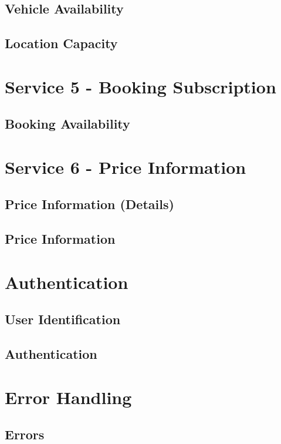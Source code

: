 \subsection*{Vehicle Availability}



\subsection*{Location Capacity}



\section{Service 5 - Booking Subscription}
\label{sec:Datenmodell:Dienst5}

\subsection*{Booking Availability}



\section{Service 6 - Price Information}
\label{sec:Datenmodell:Dienst6}

\subsection*{Price Information (Details)}



\subsection*{Price Information}



\section{Authentication}
\label{sec:Datenmodell:Auth}

\subsection*{User Identification}



\subsection*{Authentication}




\section{Error Handling}
\subsection*{Errors}


